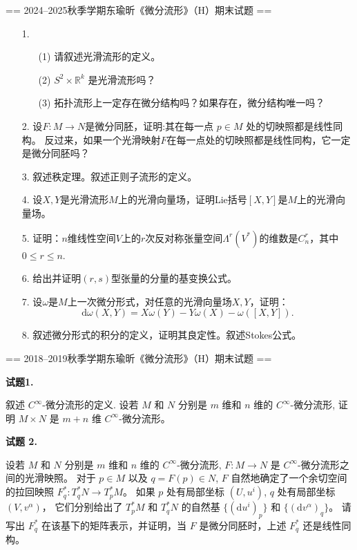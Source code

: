 == 2024--2025秋季学期东瑜昕《微分流形》（H）期末试题 ==
\begin{itemize}
    \item[1.]
    \begin{enumerate}
        \item[(1)]
        请叙述光滑流形的定义。
        \item[(2)]
        $S^2 \times \mathbb{R}^k$ 是光滑流形吗？
        \item[(3)]
        拓扑流形上一定存在微分结构吗？如果存在，微分结构唯一吗？
    \end{enumerate}
    
    \item[2.]
        设$F: M \to N$是微分同胚，证明:其在每一点 $p\in M$ 处的切映照都是线性同构。
        反过来，如果一个光滑映射$F$在每一点处的切映照都是线性同构，它一定是微分同胚吗？
    \item[3.]
    叙述秩定理。叙述正则子流形的定义。
    
    \item[4.]
    设$X,Y$是光滑流形$M$上的光滑向量场，证明Lie括号$[X,Y]$是$M$上的光滑向量场。

    \item[5.]
    证明：$n$维线性空间$V$上的$r$次反对称张量空间$\Lambda^r (V^*)$的维数是$C_n^r$，其中 $0\leq r \leq n$.
    \item[6.]
    给出并证明$(r,s)$型张量的分量的基变换公式。
    \item[7.]
    设$\omega$是$M$上一次微分形式，对任意的光滑向量场$X,Y$，证明：
    \[\text{d} \omega(X,Y) = X\omega(Y)-Y\omega(X)-\omega([X,Y]).\]
    \item[8.]
    叙述微分形式的积分的定义，证明其良定性。叙述Stokes公式。
\end{itemize}

== 2018--2019秋季学期东瑜昕《微分流形》（H）期末试题 ==

\textbf{试题1.}

\qquad 叙述 $C^{\infty}$-微分流形的定义. 设若 $M$ 和 $N$ 分别是 $m$ 维和 $n$ 维的 $C^{\infty}$-微分流形, 证明 $M \times N$ 是 $m+n$ 维 $C^{\infty}$-微分流形。

\textbf{试题 2.}

\qquad 设若 $M$ 和 $N$ 分别是 $m$ 维和 $n$ 维的 $C^{\infty}$-微分流形, 
$F: M \rightarrow N$ 是 $C^{\infty}$-微分流形之间的光滑映照。
对于 $p \in M$ 以及 $q=F(p) \in N$, $F$ 自然地确定了一个余切空间的拉回映照 $F_{q}^{*}: T_{q}^{*} N \rightarrow T_{p}^{*} M$。
如果 $p$ 处有局部坐标 $\left(U, u^{i}\right)$, $q$ 处有局部坐标 $\left(V, v^{\alpha}\right)$，
它们分别给出了 $T_{p}^{*} M$ 和 $T_{q}^{*} N$ 的自然基 $\{(\mathrm{d} u^{i})_{p}\}$ 和 $\{(\mathrm{d} v^{\alpha})_{q}\}$。
请写出 $F_{q}^{*}$ 在该基下的矩阵表示，并证明，当 $F$ 是微分同胚时，上述 $F_{q}^{*}$ 还是线性同构。


